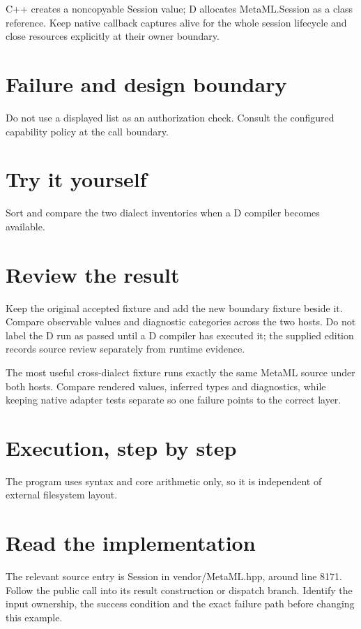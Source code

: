 \clearpage
{}
C++ creates a noncopyable Session value; D allocates MetaML.Session as a class reference. Keep native callback captures alive for the whole session lifecycle and close resources explicitly at their owner boundary.


\section*{Failure and design boundary}
Do not use a displayed list as an authorization check. Consult the configured capability policy at the call boundary.

\section*{Try it yourself}
Sort and compare the two dialect inventories when a D compiler becomes available.

\section*{Review the result}
Keep the original accepted fixture and add the new boundary fixture beside it. Compare observable values and diagnostic categories across the two hosts. Do not label the D run as passed until a D compiler has executed it; the supplied edition records source review separately from runtime evidence.

\clearpage
{}
The most useful cross-dialect fixture runs exactly the same MetaML source under both hosts. Compare rendered values, inferred types and diagnostics, while keeping native adapter tests separate so one failure points to the correct layer.


\section*{Execution, step by step}
The program uses syntax and core arithmetic only, so it is independent of external filesystem layout.

\section*{Read the implementation}
The relevant source entry is Session in vendor/MetaML.hpp, around line 8171. Follow the public call into its result construction or dispatch branch. Identify the input ownership, the success condition and the exact failure path before changing this example.

